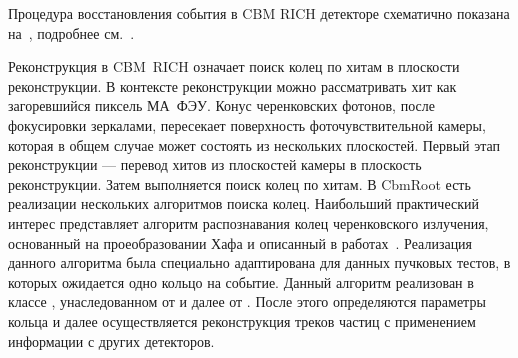 \bigskip

Процедура восстановления события в CBM RICH детекторе схематично показана на~, подробнее см.~\cite{}.

Реконструкция в CBM~RICH означает поиск колец по хитам в плоскости реконструкции. В контексте реконструкции можно рассматривать хит как загоревшийся пиксель МА~ФЭУ. Конус черенковских фотонов, после фокусировки зеркалами, пересекает поверхность фоточувствительной камеры, которая в общем случае может состоять из нескольких плоскостей. Первый этап реконструкции --- перевод хитов из плоскостей камеры в плоскость реконструкции. Затем выполняется поиск колец по хитам. В CbmRoot есть реализации нескольких алгоритмов поиска колец. Наибольший практический интерес представляет алгоритм распознавания колец черенковского излучения, основанный на проеобразовании Хафа и описанный в работах~\cite{RECOPEPAN, RECO2}. Реализация данного алгоритма была специально адаптирована для данных пучковых тестов, в которых ожидается одно кольцо на событие. Данный алгоритм реализован в классе , унаследованном от  и далее от . После этого определяются параметры кольца и далее осуществляется реконструкция треков частиц с применением информации с других детекторов.

